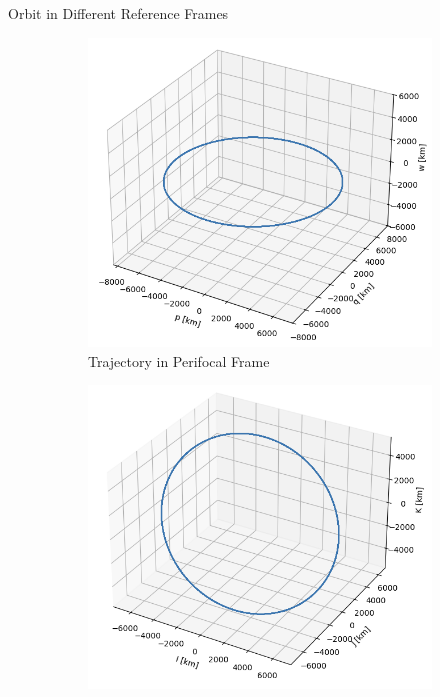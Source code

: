 \begin{hwkProblem}{2}{Orbit in Different Reference Frames}
	\begin{figure}[H] \label{fig:s02a}
		\begin{center}
			\begin{subfigure}{0.3\textwidth} \label{fig:s02a1}
				\includegraphics[width=\linewidth]{./outputs/figures/s02a1.png}
				\caption{Trajectory in Perifocal Frame}
			\end{subfigure}
			\hfill
			\begin{subfigure}{0.3\textwidth} \label{fig:s02a2}
				\includegraphics[width=\linewidth]{./outputs/figures/s02a2.png}

\end{subfigure}
\end{center}
\end{figure}
\end{hwkProblem}
